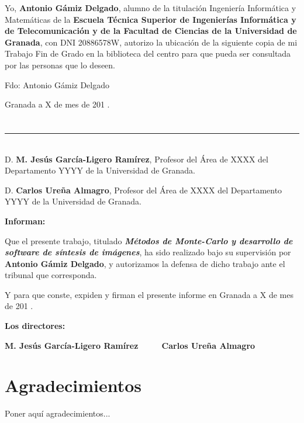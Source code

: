 Yo, \textbf{Antonio Gámiz Delgado}, alumno de la titulación Ingeniería Informática y Matemáticas de la \textbf{Escuela Técnica Superior de Ingenierías Informática y de Telecomunicación y de la Facultad de Ciencias de la Universidad de Granada}, con DNI 20886578W, autorizo la ubicación de la siguiente copia de mi Trabajo Fin de Grado en la biblioteca del centro para que pueda ser consultada por las personas que lo deseen.

\vspace{6cm}

\noindent Fdo: Antonio Gámiz Delgado

\vspace{2cm}

\begin{flushright}
Granada a X de mes de 201 .
\end{flushright}


\chapter*{}
\thispagestyle{empty}

\noindent\rule[-1ex]{\textwidth}{2pt}\\[4.5ex]

D. \textbf{M. Jesús García-Ligero Ramírez}, Profesor del Área de XXXX del Departamento YYYY de la Universidad de Granada.

\vspace{0.5cm}

D. \textbf{Carlos Ureña Almagro}, Profesor del Área de XXXX del Departamento YYYY de la Universidad de Granada.


\vspace{0.5cm}

\textbf{Informan:}

\vspace{0.5cm}

Que el presente trabajo, titulado \textit{\textbf{Métodos de Monte-Carlo y desarrollo de software de síntesis de imágenes}}, ha sido realizado bajo su supervisión por \textbf{Antonio Gámiz Delgado}, y autorizamos la defensa de dicho trabajo ante el tribunal que corresponda.

\vspace{0.5cm}

Y para que conste, expiden y firman el presente informe en Granada a X de mes de 201 .

\vspace{1cm}

\textbf{Los directores:}

\vspace{5cm}

\noindent \textbf{M. Jesús García-Ligero Ramírez\ \ \ \ \ Carlos Ureña Almagro}

\chapter*{Agradecimientos}
\thispagestyle{empty}

       \vspace{1cm}


Poner aquí agradecimientos...

